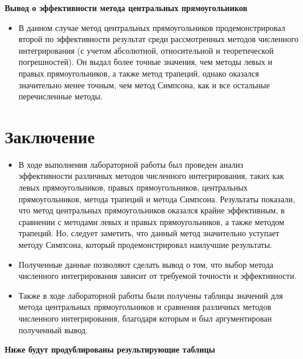 \documentclass{article}
\begin{document}
\textbf{\large{Вывод о эффективности метода центральных прямоугольников}} \\
\begin{itemize}
    \item В данном случае метод центральных прямоугольников продемонстрировал второй по эффективности результат среди рассмотренных методов численного интегрирования (с учетом абсолютной, относительной и теоретической погрешностей). Он выдал более точные значения, чем методы левых и правых прямоугольников, а также метод трапеций, однако оказался значительно менее точным, чем метод Симпсона, как и все остальные перечисленные методы.
\end{itemize}

\section*{Заключение}
 \begin{itemize}
     \item В ходе выполнения лабораторной работы был проведен анализ эффективности различных методов численного интегрирования, таких как левых прямоугольников, правых прямоугольников, центральных прямоугольников, метода трапеций и метода Симпсона.  Результаты показали, что метод центральных прямоугольников оказался крайне эффективным, в сравнении с методами левых и правых прямоугольников, а также методом трапеций. Но, следует заметить, что данный метод значительно уступает методу Симпсона, который продемонстрировал наилучшие результаты.
     \item Полученные данные позволяют сделать вывод о том, что выбор метода численного интегрирования зависит от требуемой точности и эффективности.
     \item Также в ходе лабораторной работы были получены таблицы  значений для метода центральных прямоугольников и сравнения различных методов численного интегрирования, благодаря которым и был аргументирован полученный вывод.
     
 \end{itemize}

 \textbf{\large{Ниже будут продублированы результирующие таблицы}} \\
 
\end{document}
